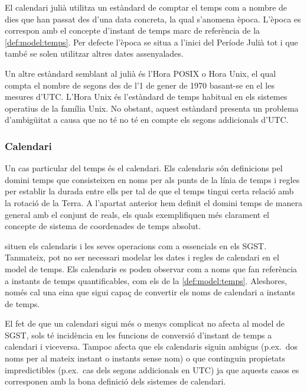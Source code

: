 El calendari julià utilitza un estàndard de comptar el temps com a
nombre de dies que han passat des d'una data concreta, la qual
s'anomena època. L'època es correspon amb el concepte d'instant de
temps marc de referència de la \autoref{def:model:temps}. Per defecte
l'època se situa a l'inici del Període Julià tot i que també se solen
utilitzar altres dates assenyalades.

Un altre estàndard semblant al julià és l'Hora POSIX o Hora Unix, el
qual compta el nombre de segons des de l'1 de gener de 1970 basant-se
en el les mesures d'UTC. L'Hora Unix és l'estàndard de temps habitual
en els sistemes operatius de la família Unix. No obstant, aquest
estàndard presenta un problema d'ambigüitat a causa que no té no té en
compte els segons addicionals d'UTC.





\subsubsection{Calendari}

Un cas particular del temps és el calendari. Els calendaris són
definicions pel domini temps que consisteixen en noms per als punts de
la línia de temps i regles per establir la durada entre ells per tal
de que el temps tingui certa relació amb la rotació de la Terra. A
l'apartat anterior hem definit el domini temps de manera general
amb el conjunt de reals, els quals exemplifiquen més clarament el
concepte de sistema de coordenades de temps absolut.

\textcite{dreyer94} situen els calendaris i les seves operacions com a
essencials en els SGST. Tanmateix, pot no ser necessari modelar les
dates i regles de calendari en el model de temps. Els calendaris es
poden observar com a noms que fan referència a instants de temps
quantificables, com els de la \autoref{def:model:temps}. Aleshores,
només cal una eina que sigui capaç de convertir els noms de calendari
a instants de temps.

El fet de que un calendari sigui més o menys complicat no afecta al
model de SGST, sols té incidència en les funcions de conversió
d'instant de temps a calendari i viceversa. Tampoc afecta que els
calendaris siguin ambigus (p.ex.\ dos noms per al mateix instant o
instants sense nom) o que continguin propietats impredictibles (p.ex.\
cas dels segons addicionals en UTC) ja que aquests casos es
corresponen amb la bona definició dels sistemes de calendari.

